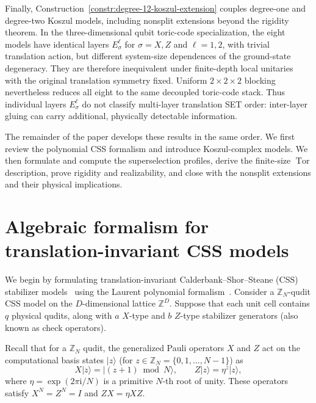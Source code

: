 \documentclass[aps,prx,english,superscriptaddress,twocolumn,tightenlines,showpacs,longbibliography,floatfix,amsfonts]{revtex4-2}
\theoremstyle{remark}
\theoremstyle{definition}
\begin{document}
	Finally, Construction~\ref{constr:degree-12-koszul-extension} couples
	degree-one and degree-two Koszul models, including nonsplit extensions beyond
	the rigidity theorem. In the three-dimensional qubit toric-code
	specialization, the eight models have identical layers \(E_\sigma^\ell\) for
	\(\sigma=X,Z\) and \(\ell=1,2\), with trivial translation action, but
	different system-size dependences of the ground-state degeneracy. They are
	therefore inequivalent under
	finite-depth local unitaries with the original translation symmetry fixed.
	Uniform \(2\times2\times2\) blocking nevertheless
	reduces all eight to the same decoupled toric-code stack. Thus
	individual layers \(E_\sigma^\ell\) do not classify multi-layer translation
	SET order: inter-layer gluing can carry additional, physically
	detectable information.

	The remainder of the paper develops these results in the same order. We
	first review the polynomial CSS formalism and introduce Koszul-complex
	models. We then formulate and compute the superselection profiles, derive
	the finite-size \(\operatorname{Tor}\) description, prove rigidity and
	realizability, and close with the nonsplit extensions and their physical
	implications.

\section{Algebraic formalism for translation-invariant CSS models}
\label{sec:polynomial-formalism}

We begin by formulating translation-invariant Calderbank--Shor--Steane (CSS)
stabilizer models~\cite{CalderbankShor1996,Steane1996} using the Laurent
polynomial formalism~\cite{Haah2013}. Consider a $\mathbb{Z}_N$-qudit CSS
model on the $D$-dimensional lattice $\mathbb{Z}^D$. Suppose that each unit
cell contains $q$ physical qudits, along with $a$ $X$-type and $b$ $Z$-type
stabilizer generators (also known as check operators).

Recall that for a $\mathbb{Z}_N$ qudit, the generalized Pauli operators $X$ and $Z$ act on the computational basis states $|z \rangle$ (for $z \in \mathbb{Z}_N =\{0, 1, \dots, N-1\}$) as
\begin{equation}
	X| z \rangle = | (z + 1) \bmod N \rangle, \qquad Z|z \rangle = \eta^z |z \rangle,
\end{equation}
where $\eta = \exp(2\pi \mathrm{i}/ N)$ is a primitive $N$-th root of unity. These operators satisfy $X^N = Z^N = I$ and $ZX = \eta XZ$.
\end{document}
